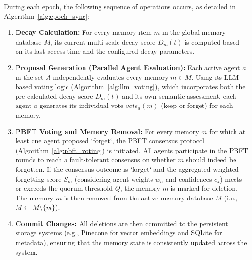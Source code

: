 \documentclass[conference]{IEEEtran}
\begin{document}
During each epoch, the following sequence of operations occurs, as detailed in Algorithm~\ref{alg:epoch_sync}:

\begin{enumerate}
    \item \textbf{Decay Calculation:} For every memory item $m$ in the global memory database $M$, its current multi-scale decay score $D_m(t)$ is computed based on its last access time and the configured decay parameters.
    \item \textbf{Proposal Generation (Parallel Agent Evaluation):} Each active agent $a$ in the set $A$ independently evaluates every memory $m \in M$. Using its LLM-based voting logic (Algorithm~\ref{alg:llm_voting}), which incorporates both the pre-calculated decay score $D_m(t)$ and its own semantic assessment, each agent $a$ generates its individual vote $vote_a(m)$ (keep or forget) for each memory.
    \item \textbf{PBFT Voting and Memory Removal:} For every memory $m$ for which at least one agent proposed `forget`, the PBFT consensus protocol (Algorithm~\ref{alg:pbft_voting}) is initiated. All agents participate in the PBFT rounds to reach a fault-tolerant consensus on whether $m$ should indeed be forgotten. If the consensus outcome is `forget` and the aggregated weighted forgetting score $S_m$ (considering agent weights $w_a$ and confidences $c_a$) meets or exceeds the quorum threshold $Q$, the memory $m$ is marked for deletion. The memory $m$ is then removed from the active memory database $M$ (i.e., $M \leftarrow M \setminus \{m\}$). 
    \item \textbf{Commit Changes:} All deletions are then committed to the persistent storage systems (e.g., Pinecone for vector embeddings and SQLite for metadata), ensuring that the memory state is consistently updated across the system.
\end{enumerate}
\end{document}
